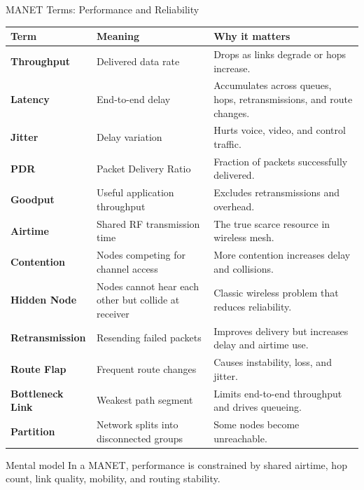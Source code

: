 \documentclass[aspectratio=169]{beamer}
\begin{document}
\begin{frame}{MANET Terms: Performance and Reliability}
\tiny
\begin{tabular}{p{2.0cm} p{3.4cm} p{6.7cm}}
\toprule
\textbf{Term} & \textbf{Meaning} & \textbf{Why it matters} \\
\midrule
\textbf{Throughput} & Delivered data rate & Drops as links degrade or hops increase. \\
\textbf{Latency} & End-to-end delay & Accumulates across queues, hops, retransmissions, and route changes. \\
\textbf{Jitter} & Delay variation & Hurts voice, video, and control traffic. \\
\textbf{PDR} & Packet Delivery Ratio & Fraction of packets successfully delivered. \\
\textbf{Goodput} & Useful application throughput & Excludes retransmissions and overhead. \\
\textbf{Airtime} & Shared RF transmission time & The true scarce resource in wireless mesh. \\
\textbf{Contention} & Nodes competing for channel access & More contention increases delay and collisions. \\
\textbf{Hidden Node} & Nodes cannot hear each other but collide at receiver & Classic wireless problem that reduces reliability. \\
\textbf{Retransmission} & Resending failed packets & Improves delivery but increases delay and airtime use. \\
\textbf{Route Flap} & Frequent route changes & Causes instability, loss, and jitter. \\
\textbf{Bottleneck Link} & Weakest path segment & Limits end-to-end throughput and drives queueing. \\
\textbf{Partition} & Network splits into disconnected groups & Some nodes become unreachable. \\
\bottomrule
\end{tabular}

\vspace{0.15cm}
\begin{block}{Mental model}
In a MANET, performance is constrained by shared airtime, hop count, link quality, mobility, and routing stability.
\end{block}
\end{frame}
\end{document}
